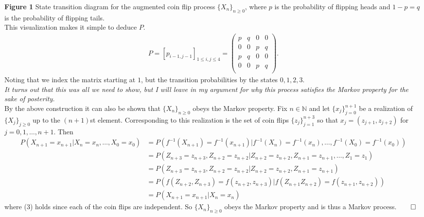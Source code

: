 \documentclass[11pt, letterpaper]{article}
\newcommand{\mbb}[1]{\mathbb{#1}}
\begin{document}
\begin{center}
\end{center}
{\bf Figure 1} State transition diagram for the augmented coin flip process $\{X_n\}_{n\geq 0}$, where $p$ is the probability of flipping heads and $1-p=q$ is the probability of flipping tails.\\[10pt]
This visualization makes it simple to deduce $P$.
\begin{align*}
    P=[p_{i-1,j-1}]_{1\leq i,j\leq 4}=\begin{pmatrix}
        p & q & 0 & 0 \\
        0 & 0 & p & q \\
        p & q & 0 & 0 \\
        0 & 0 & p & q \\
    \end{pmatrix}.
\end{align*}
Noting that we index the matrix starting at $1$, but the transition probabilities by the states $0,1,2,3$.\\[10pt]
{\it It turns out that this was all we need to show, but I will leave in my argument for why this process satisfies the Markov property for the sake of posterity.}\\[10pt]
By the above construction it can also be shown that $\{X_n\}_{n\geq 0}$ obeys the Markov property. Fix $n\in\mbb{N}$ and let $\{x_j\}_{j=0}^{n+1}$ be a realization of $\{X_j\}_{j\geq 0}$ up to the $(n+1)$st element. Corresponding to this
realization is the set of coin flips $\{z_j\}_{j=1}^{n+3}$ so that $x_j=(z_{j+1},z_{j+2})$ for $j=0,1,\dots,n+1$. Then
\begin{align*}
    P(X_{n+1}=x_{n+1}|X_n=x_{n},\dots,X_0=x_0)&=P(f^{-1}(X_{n+1})=f^{-1}(x_{n+1})|f^{-1}(X_n)=f^{-1}(x_{n}),\dots,f^{-1}(X_0)=f^{-1}(x_0))\\
    &=P(Z_{n+3}=z_{n+3},Z_{n+2}=z_{n+2}|Z_{n+2}=z_{n+2},Z_{n+1}=z_{n+1},\dots,Z_1=z_1)\\
    &=P(Z_{n+3}=z_{n+3},Z_{n+2}=z_{n+2}|Z_{n+2}=z_{n+2},Z_{n+1}=z_{n+1})\tag{3}\\
    &=P(f(Z_{n+2},Z_{n+3})=f(z_{n+2},z_{n+3})|f(Z_{n+1}Z_{n+2})=f(z_{n+1},z_{n+2}))\\
    &=P(X_{n+1}=x_{n+1}|X_n=x_n)
\end{align*}
where (3) holds since each of the coin flips are independent. So $\{X_n\}_{n\geq 0}$ obeys the Markov property and is thus a Markov process.\hfill{$\qed$}\\[10pt]
\end{document}
